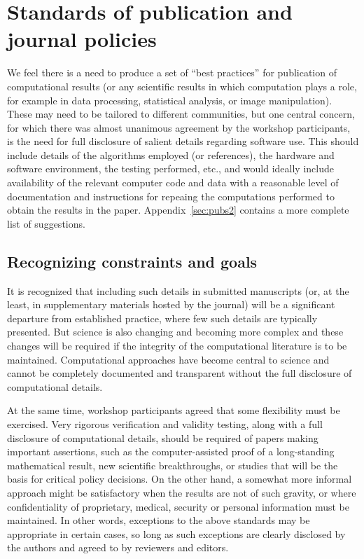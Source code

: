 \documentclass[11pt]{article}
\begin{document}
\section{Standards of publication and journal policies} \label{sec:pubs}
We feel there is a need to produce a set of ``best practices'' 
for publication of computational results (or any scientific results in which
computation plays a role, for example in data processing, statistical
analysis, or image manipulation).   
These may need to be tailored to different communities, but one
central concern, for which there was almost unanimous agreement by
the workshop participants, is the need for full disclosure of salient
details regarding software use. This should include details of the
algorithms employed (or references), the hardware and software environment,
the testing performed, etc., and would ideally include availability of the
relevant computer code and data with a reasonable level of documentation and
instructions for repeaing the computations performed to obtain the results
in the paper. Appendix~\ref{sec:pubs2} contains a more complete list of
suggestions.

\subsection{Recognizing constraints and goals}
It is recognized that including such details in submitted manuscripts (or,
at the least, in supplementary materials hosted by the journal) 
will be a significant departure
from established practice, where few such details are typically presented.
But science is also changing and becoming more complex and these changes
will be required if the integrity of the computational literature is to be
maintained.
Computational approaches have become central to
science and cannot be completely documented and transparent without the
full disclosure of computational details.  

At the same time, workshop participants agreed that some flexibility must be
exercised.  Very rigorous verification and validity testing, along with a
full disclosure of computational details, should be required of papers making
important assertions, such as the computer-assisted proof of a long-standing
mathematical result, new scientific breakthroughs, or studies that will be
the basis for critical policy decisions.  
On the other hand, a
somewhat more informal approach might be satisfactory when the results are
not of such gravity, or where confidentiality of proprietary, medical,
security or personal information must be maintained.  In other words,
exceptions to the above standards may be appropriate in certain cases, so
long as such exceptions are clearly disclosed by the authors and agreed to
by reviewers and editors.
\end{document}
